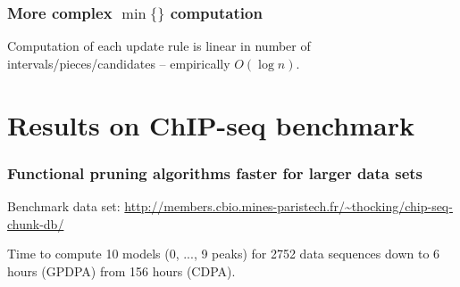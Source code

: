 \documentclass{beamer}
\begin{document}
\begin{frame}
  \frametitle{More complex $\min\{\}$ computation}
  Computation of each update rule is linear in number of
  intervals/pieces/candidates -- empirically $O(\log n)$.
  \begin{minipage}[t]{\linewidth}
  \hskip -1cm
   
  \end{minipage}
\end{frame}








\section{Results on ChIP-seq benchmark}

\begin{frame}
  \frametitle{Functional pruning algorithms faster for larger data sets}

Benchmark data set: \url{http://members.cbio.mines-paristech.fr/~thocking/chip-seq-chunk-db/}

  

Time to compute 10 models (0, ..., 9 peaks) for 2752 data
    sequences down to \textcolor{GPDPA}{6 hours (GPDPA)} from
    \textcolor{CDPA}{156 hours (CDPA)}.
\end{frame}
\end{document}
